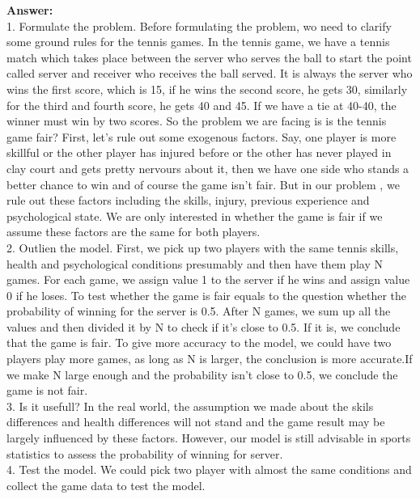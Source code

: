 \documentclass[12pt]{article}
\begin{document}
\noindent\textbf{Answer:} \\
1. Formulate the problem. Before formulating the problem, wo need to clarify some ground rules for the tennis games. In the tennis game, we have a tennis match which takes place between the server who serves the ball to start the point called server and receiver who receives the ball served. It is always the server who wins the first score, which is 15, if he wins the second score, he gets 30, similarly for the third and fourth score, he gets 40 and 45. If we have a tie at 40-40, the winner must win by two scores. So the problem we are facing is is the tennis game fair? First, let's rule out some exogenous factors. Say, one player is more skillful or the other player has injured before or the other has never played in clay court and gets pretty nervours about it, then we have one side who stands a better chance to win and of course the game isn't fair. But in our problem , we rule out these factors including the skills, injury, previous experience and psychological state. We are only interested in whether the game is fair if we assume these factors are the same for both players.\\
2. Outlien the model. First, we pick up two players with the same tennis skills, health and psychological conditions presumably and then have them play N games. For each game, we assign value 1 to the server if he wins and assign value 0 if he loses. To test whether the game is fair equals to the question whether the probability of winning for the server is 0.5. After N games, we sum up all the values and then divided it by N to check if it's close to 0.5. If it is, we conclude that the game is fair. To give more accuracy to the model, we could have two players play more games, as long as N is larger, the conclusion is more accurate.If we make N large enough and the probability isn't close to 0.5, we conclude the game is not fair.\\
3. Is it usefull? In the real world, the assumption we made about the skils differences and health differences will not stand and the game result may be largely influenced by these factors. However, our model is still advisable in sports statistics  to assess the probability of winning for server. \\
4. Test the model. We could pick two player with almost the same conditions  and collect the game data to test the model. \\
\end{document}
